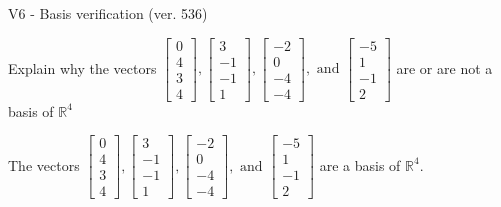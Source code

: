 \begin{exercise}
  \begin{exerciseTitle}V6 - Basis verification (ver. 536)\end{exerciseTitle}
  \begin{exerciseStatement}
    Explain why the vectors \(\left[\begin{array}{r}
0 \\
4 \\
3 \\
4
\end{array}\right] , \left[\begin{array}{r}
3 \\
-1 \\
-1 \\
1
\end{array}\right] , \left[\begin{array}{r}
-2 \\
0 \\
-4 \\
-4
\end{array}\right] , \text{ and } \left[\begin{array}{r}
-5 \\
1 \\
-1 \\
2
\end{array}\right]\) are or are not a basis of \(\mathbb{R}^4\)	


  \end{exerciseStatement}
  \begin{exerciseAnswer}
   The vectors \(\left[\begin{array}{r}
0 \\
4 \\
3 \\
4
\end{array}\right] , \left[\begin{array}{r}
3 \\
-1 \\
-1 \\
1
\end{array}\right] , \left[\begin{array}{r}
-2 \\
0 \\
-4 \\
-4
\end{array}\right] , \text{ and } \left[\begin{array}{r}
-5 \\
1 \\
-1 \\
2
\end{array}\right]\) 
  	 are  a basis of \(\mathbb{R}^4\).
  


  \end{exerciseAnswer}
\end{exercise}